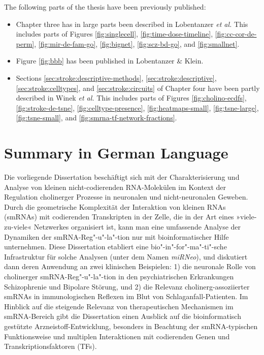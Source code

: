 \noindent The following parts of the thesis have been previously published:
\begin{itemize}[noitemsep, leftmargin=.5cm, label={\tiny\raisebox{.5ex}{\textbullet}}, topsep = 0pt]
\item Chapter three has in large parts been described in Lobentanzer \emph{et al.}\cite{Lobentanzer2019a} This includes parts of Figures \ref{fig:singlecell}, \ref{fig:time-dose-timeline}, \ref{fig:cc-cor-de-perm}, \ref{fig:mir-de-fam-go}, \ref{fig:bignet}, \ref{fig:scz-bd-go}, and \ref{fig:smallnet}.
\item Figure \ref{fig:bbb} has been published in Lobentanzer \& Klein.\cite{Lobentanzer2019b}
\item Sections \ref{sec:stroke:descriptive-methods}, \ref{sec:stroke:descriptive}, \ref{sec:stroke:celltypes}, and \ref{sec:stroke:circuits} of Chapter four have been partly described in Winek \emph{et al.}\cite{Winek2020} This includes parts of Figures \ref{fig:cholino-ecdfs}, \ref{fig:stroke-de-tsne}, \ref{fig:celltype-presence}, \ref{fig:heatmaps-small}, \ref{fig:tsne-large}, \ref{fig:tsne-small}, and \ref{fig:smrna-tf-network-fractions}.
\end{itemize}

\newpage

\section{Summary in German Language}


Die vorliegende Dissertation beschäftigt sich mit der Charakterisierung und Analyse von kleinen nicht-codierenden RNA-Molekülen im Kontext der Regulation cholinerger Prozesse in neuronalen und nicht-neuronalen Geweben. Durch die geometrische Komplexität der Interaktion von kleinen RNAs (smRNAs) mit codierenden Transkripten in der Zelle, die in der Art eines »viele-zu-viele« Netzwerkes organisiert ist, kann man eine umfassende Analyse der Dynamiken der smRNA-Reg"-u"-la"-tion nur mit bioinformatischer Hilfe unternehmen. Diese Dissertation etabliert eine bio"-in"-for"-ma"-ti"-sche Infrastruktur für solche Analysen (unter dem Namen \emph{miRNeo}), und diskutiert dann deren Anwendung an zwei klinischen Beispielen: 1) die neuronale Rolle von cholinerger smRNA-Reg"-u"-la"-tion in den psychiatrischen Erkrankungen Schizophrenie und Bipolare Störung,\cite{Lobentanzer2019a} und 2) die Relevanz cholinerg-assoziierter smRNAs in immunologischen Reflexen im Blut von Schlaganfall-Patienten.\cite{Winek2020} Im Hinblick auf die steigende Relevanz von therapeutischen Mechanismen im smRNA-Bereich gibt die Dissertation einen Ausblick auf die bioinformatisch gestützte Arzneistoff-Entwicklung, besonders in Beachtung der smRNA-typischen Funktionsweise und multiplen Interaktionen mit codierenden Genen und Transkriptionsfaktoren (TFs).

